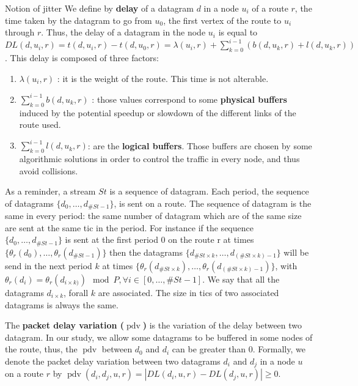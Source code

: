 \documentclass[10pt]{article}
\DeclareMathOperator{\pdv}{pdv}
\begin{document}
  \begin{subsection}{Notion of jitter}
   We define by {\bf delay} of a datagram $d$ in a node $u_i$ of a route $r$, the time taken by the datagram to go from $u_0$, the first vertex of the route to $u_i$ through $r$.
 Thus, the delay of a datagram in the node $u_i$ is equal to $DL(d,u_i,r) =  t(d,u_i,r) - t(d,u_0,r) = \lambda(u_i,r) + \sum_{k=0}^{i-1}( b(d,u_k,r) + l(d,u_k,r))$.
This delay is composed of three factors:
\begin{enumerate}
\item $\lambda(u_i,r)$ : it is the weight of the route. This time is not alterable. 
\item  $\sum_{k=0}^{i-1} b(d,u_k,r)$ : those values correspond to some {\bf physical buffers } induced by the potential speedup or slowdown of the different links of the route used.
\item $\sum_{k=0}^{i-1} l(d,u_k,r)$: are the {\bf logical buffers}. Those buffers are chosen by some algorithmic solutions in order to control the traffic in every node, and thus avoid collisions.
\end{enumerate}

As a reminder, a stream $St$ is a sequence of datagram. Each period, the sequence of datagrams $\{d_0,\ldots,d_{\#St-1}\}$, is sent on a route. The sequence of datagram is the same in every period: the same number of datagram which are of the same size are sent at the same tic in the period. For instance if the sequence $\{d_0,\ldots,d_{\#St-1}\}$ is sent at the first period $0$ on the route r at times $\{\theta_r(d_0),\ldots,\theta_r(d_{\#St-1})\}$ then the datagrams $\{d_{\#St \times k},\ldots,d_{(\#St \times k)-1}\}$ will be send in the next period $k$ at times $\{\theta_r(d_{\#St \times k}),\ldots,\theta_r(d_{(\#St \times k)-1})\}$, with $\theta_r(d_i) = \theta_r(d_{i \times k)}) \mod P, \forall i \in [0,\ldots,\#St-1]$. We say that all the datagrams $d_{i \times k}$, forall $k$ are associated. The size in tics of two associated datagrams is always the same. 

The {\bf packet delay variation ($\pdv$) }\cite{demichelis_ip_nodate} is the variation of the delay between two datagram. In our study, we allow some datagrams to be buffered in some nodes of the route, thus, the $\pdv$ between $d_0$ and $d_i$ can be greater than $0$. Formally, we denote the packet delay variation between two datagrams $d_i$ and $d_j$ in a node $u$ on a route $r$ by $\pdv(d_i,d_j,u,r) = |DL(d_i,u,r) - DL(d_j,u,r) | \ge 0$. 


\end{subsection}
\end{document}
